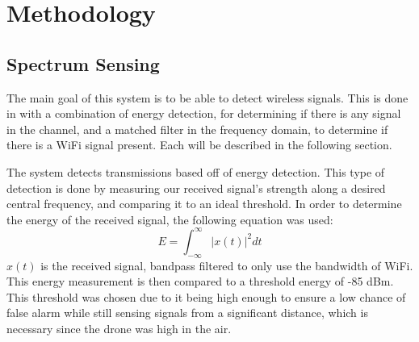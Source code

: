 \chapter{Methodology}
\section{Spectrum Sensing} \label{methods:processing}
The main goal of this system is to be able to detect wireless signals. This is done in with a combination of energy detection, for determining if there is any signal in the channel, and a matched filter in the frequency domain, to determine if there is a WiFi signal present. Each will be described in the following section.\par
The system detects transmissions based off of energy detection. This type of detection is done by measuring our received signal’s strength along a desired central frequency, and comparing it to an ideal threshold. In order to determine the energy of the received signal, the following equation was used:
\[E = \int_{-\infty}^{\infty}| x(t) |^2dt\]
$x(t)$ is the received signal, bandpass filtered to only use the bandwidth of WiFi. This energy measurement is then compared to a threshold energy of -85 dBm. This threshold was chosen due to it being high enough to ensure a low chance of false alarm while still sensing signals from a significant distance, which is necessary since the drone was high in the air. \par

